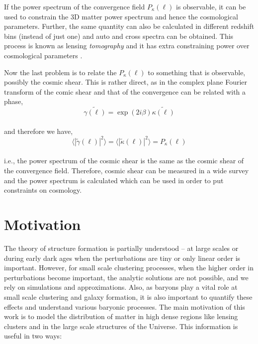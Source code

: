 \documentclass[
  11pt,
  twoside,
  openright,
  titlepage,
  headings=optiontoheadandtoc
]{scrbook}
\begin{document}
If the power spectrum of the convergence field $P_{\kappa}(\ell)$ is observable, it can be
used to constrain the 3D matter power spectrum and hence the cosmological parameters. Further,
the same quantity can also be calculated in different redshift bins (instead of just one) and
auto and cross spectra can be obtained. This process is known as 
lensing {\it tomography} and it has extra constraining power over cosmological parameters
\cite{1999ApJ...522L..21H,2004MNRAS.348..897T}.

Now the last problem is to relate the $P_{\kappa}(\ell)$ to something that is observable, 
possibly the cosmic shear. This is rather direct, as in the complex plane Fourier transform
of the comic shear and that of the
convergence can be related with a phase,
\begin{equation}
	\tilde{\gamma(\ell)} = \exp(2i\beta) \tilde{\kappa(\ell)}
\end{equation}
\\
and therefore we have,
\begin{equation}
	\langle |\tilde{\gamma}(\ell)|^2 \rangle = 
	\langle |\tilde{\kappa}(\ell)|^2 \rangle = P_{\kappa}(\ell)
\end{equation}
\\
i.e., the power spectrum of the cosmic shear is the same as the cosmic shear of the
convergence field. Therefore, cosmic shear can be measured in a wide survey and the 
power spectrum is calculated which can be used in order to put constraints on
cosmology.




\section{Motivation}

The theory of structure formation is partially understood --  at large scales 
or during early dark ages when the perturbations are tiny or only linear order is important. 
However, for small scale clustering processes, when the higher order in perturbations 
become important, the analytic solutions are not possible, and we rely on simulations and 
approximations. Also, as baryons play a vital role at small scale clustering
and galaxy formation, it is also important to quantify these effects and 
understand various baryonic processes. 
The main motivation of this work is to model the distribution of matter in high dense
regions like lensing clusters and in the large scale structures of the Universe. 
This information is useful in two ways: 
\end{document}
